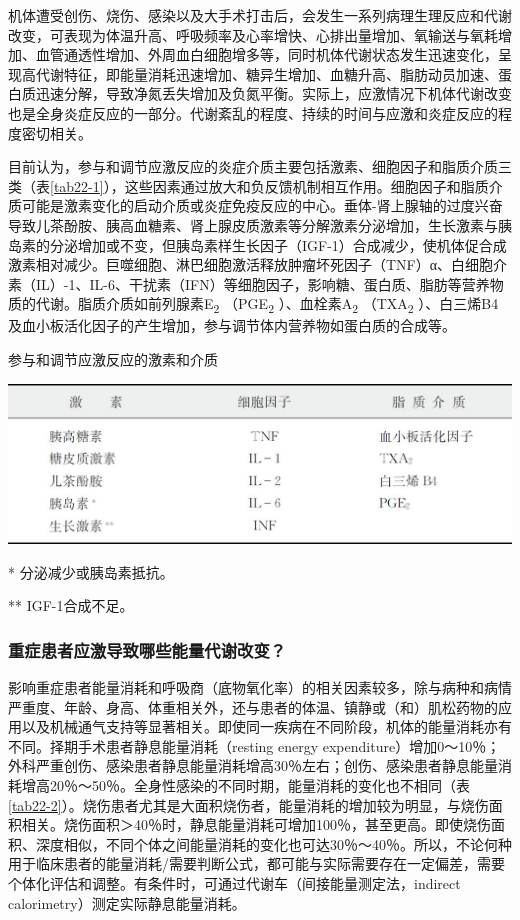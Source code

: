 机体遭受创伤、烧伤、感染以及大手术打击后，会发生一系列病理生理反应和代谢改变，可表现为体温升高、呼吸频率及心率增快、心排出量增加、氧输送与氧耗增加、血管通透性增加、外周血白细胞增多等，同时机体代谢状态发生迅速变化，呈现高代谢特征，即能量消耗迅速增加、糖异生增加、血糖升高、脂肪动员加速、蛋白质迅速分解，导致净氮丢失增加及负氮平衡。实际上，应激情况下机体代谢改变也是全身炎症反应的一部分。代谢紊乱的程度、持续的时间与应激和炎症反应的程度密切相关。

目前认为，参与和调节应激反应的炎症介质主要包括激素、细胞因子和脂质介质三类（表\ref{tab22-1}），这些因素通过放大和负反馈机制相互作用。细胞因子和脂质介质可能是激素变化的启动介质或炎症免疫反应的中心。垂体-肾上腺轴的过度兴奋导致儿茶酚胺、胰高血糖素、肾上腺皮质激素等分解激素分泌增加，生长激素与胰岛素的分泌增加或不变，但胰岛素样生长因子（IGF-1）合成减少，使机体促合成激素相对减少。巨噬细胞、淋巴细胞激活释放肿瘤坏死因子（TNF）α、白细胞介素（IL）-1、IL-6、干扰素（IFN）等细胞因子，影响糖、蛋白质、脂肪等营养物质的代谢。脂质介质如前列腺素E\textsubscript{2}
（PGE\textsubscript{2} ）、血栓素A\textsubscript{2}
（TXA\textsubscript{2}
）、白三烯B4及血小板活化因子的产生增加，参与调节体内营养物如蛋白质的合成等。

\begin{table}[htbp]
{\centering
\caption{参与和调节应激反应的激素和介质}
\label{tab22-1}
\includegraphics{./images/Image00256.jpg}}

\footnotesize
* 分泌减少或胰岛素抵抗。

** IGF-1合成不足。
\end{table}



\subsubsection{重症患者应激导致哪些能量代谢改变？}

影响重症患者能量消耗和呼吸商（底物氧化率）的相关因素较多，除与病种和病情严重度、年龄、身高、体重相关外，还与患者的体温、镇静或（和）肌松药物的应用以及机械通气支持等显著相关。即使同一疾病在不同阶段，机体的能量消耗亦有不同。择期手术患者静息能量消耗（resting
energy
expenditure）增加0～10％；外科严重创伤、感染患者静息能量消耗增高30％左右；创伤、感染患者静息能量消耗增高20％～50％。全身性感染的不同时期，能量消耗的变化也不相同（表\ref{tab22-2}）。烧伤患者尤其是大面积烧伤者，能量消耗的增加较为明显，与烧伤面积相关。烧伤面积＞40％时，静息能量消耗可增加100％，甚至更高。即使烧伤面积、深度相似，不同个体之间能量消耗的变化也可达30％～40％。所以，不论何种用于临床患者的能量消耗/需要判断公式，都可能与实际需要存在一定偏差，需要个体化评估和调整。有条件时，可通过代谢车（间接能量测定法，indirect
calorimetry）测定实际静息能量消耗。

